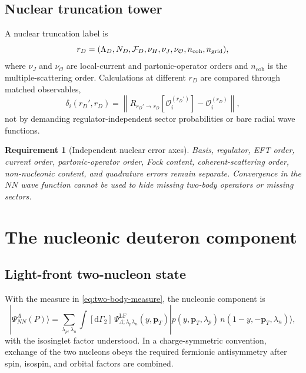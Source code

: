 \documentclass[11pt]{article}
\newtheorem{requirement}[definition]{Requirement}
\newcommand{\pT}{\bm{p}_{T}}
\newcommand{\dd}{\mathrm{d}}
\newcommand{\LF}{\mathrm{LF}}
\newcommand{\cO}{\mathcal O}
\newcommand{\NN}{NN}
\newcommand{\coh}{\mathrm{coh}}
\begin{document}
\subsection{Nuclear truncation tower}

A nuclear truncation label is
\begin{equation}
 r_D=
 (\Lambda_D,N_D,\mathcal F_D,
 \nu_H,\nu_J,\nu_{\cO},n_{\coh},n_{\rm grid}),
\label{eq:nuclear-truncation-label}
\end{equation}
where \(\nu_J\) and \(\nu_{\cO}\) are local-current and partonic-operator
orders and \(n_{\coh}\) is the multiple-scattering order.  Calculations at
different \(r_D\) are compared through matched observables,
\begin{equation}
 \delta_i(r_D',r_D)
 =\left\|
 R_{r_D'\to r_D}[\cO_i^{(r_D')}]
 -\cO_i^{(r_D)}
 \right\|,
\label{eq:nuclear-convergence-residual}
\end{equation}
not by demanding regulator-independent sector probabilities or bare radial
wave functions.

\begin{requirement}[Independent nuclear error axes]
\label{req:nuclear-error-axes}
Basis, regulator, EFT order, current order, partonic-operator order, Fock
content, coherent-scattering order, non-nucleonic content, and quadrature
errors remain separate.  Convergence in the \(NN\) wave function cannot be
used to hide missing two-body operators or missing sectors.
\end{requirement}

\section{The nucleonic deuteron component}
\label{sec:nn-component}

\subsection{Light-front two-nucleon state}

With the measure in \cref{eq:two-body-measure}, the nucleonic component is
\begin{equation}
 |\Psi_{\NN}^{\Lambda}(P)\rangle
 =\sum_{\lambda_p,\lambda_n}
 \int[\dd\Gamma_2]\,
 \Psi_{\Lambda;\lambda_p\lambda_n}^{\LF}(y,\pT)
 |p(y,\pT,\lambda_p)\,n(1-y,-\pT,\lambda_n)\rangle,
\label{eq:nn-state}
\end{equation}
with the isosinglet factor understood.  In a charge-symmetric convention,
exchange of the two nucleons obeys the required fermionic antisymmetry after
spin, isospin, and orbital factors are combined.
\end{document}
